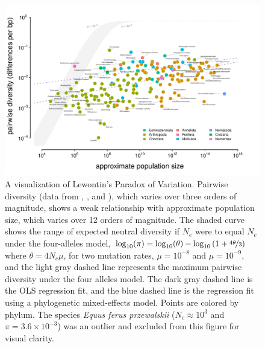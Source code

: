 \documentclass[9pt,lineno]{elife}
\newcommand{\logt}{\log_{10}}
\begin{document}
\begin{figure}
  \begin{fullwidth}
  \includegraphics[width=\linewidth]{diversity_popsize_full.pdf}

  \caption{A visualization of Lewontin's Paradox of Variation. Pairwise
    diversity (data from \cite{Leffler2012-zj}, \cite{Corbett-Detig2015-gt},
    and \cite{Romiguier2014-bp}), which varies over three orders of
    magnitude, shows a weak relationship with approximate population size,
    which varies over 12 orders of magnitude.  The shaded curve shows the range
    of expected neutral diversity if $N_e$ were to equal $N_c$ under the
    four-alleles model, $\log_{10}(\pi) = \logt(\theta) - \logt{(1 +
    \nicefrac{4\theta}{3})}$ where $\theta = 4N_c \mu$, for two mutation rates,
    $\mu = 10^{-8}$ and $\mu = 10^{-9}$, and the light gray dashed line
    represents the maximum pairwise diversity under the four alleles model. The
    dark gray dashed line is the OLS regression fit, and the blue dashed line
    is the regression fit using a phylogenetic mixed-effects model.  Points are
    colored by phylum. The species \emph{Equus ferus przewalskii} ($N_c \approx
    10^3$ and $\pi = 3.6 \times 10^{-3}$) was an outlier and excluded from this
    figure for visual clarity.}\label{fig:pi-Nc}


\end{fullwidth}
\end{figure}
\end{document}
